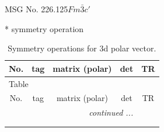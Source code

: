 \documentclass[fleqn,8pt]{jsarticle}
\begin{document}
\setcounter{MaxMatrixCols}{32}

\renewcommand{\tablename}{Table~}
\renewcommand{\figurename}{Figure~}
\begin{center}
\LARGE
MSG No. 226.125\quad$Fm\bar{3}c'$
\end{center}
* symmetry operation
\renewcommand{\arraystretch}{1.3}
\begin{longtable}{ccccc}
\caption{Symmetry operations for 3d polar vector.}
 \\
 \hline \hline
No. & tag & matrix (polar) & det & TR \\ \hline \endfirsthead

\multicolumn{4}{l}{\tablename\ \thetable{}} \\
 \hline \hline
No. & tag & matrix (polar) & det & TR \\ \hline \endhead

 \hline \hline
\multicolumn{4}{r}{\footnotesize\it continued ...} \\ \endfoot

 \hline \hline
\multicolumn{4}{r}{} \\ \endlastfoot


\end{longtable}
\end{document}
